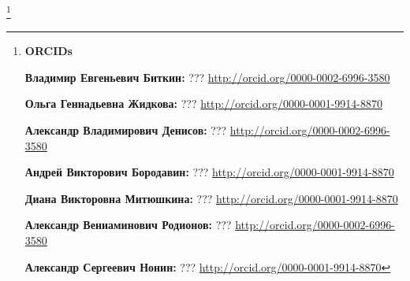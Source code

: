 \thanks{{\bf ORCIDs}



{\bf  Владимир Евгеньевич Биткин:}   ??? \url{http://orcid.org/0000-0002-6996-3580}



{\bf Ольга Геннадьевна Жидкова:}  ???  \url{http://orcid.org/0000-0001-9914-8870}



{\bf  Александр Владимирович Денисов:}   ??? \url{http://orcid.org/0000-0002-6996-3580}



{\bf Андрей Викторович Бородавин:}  ???  \url{http://orcid.org/0000-0001-9914-8870}



{\bf Диана Викторовна Митюшкина:}  ???  \url{http://orcid.org/0000-0001-9914-8870}



{\bf  Александр Вениаминович Родионов:}   ??? \url{http://orcid.org/0000-0002-6996-3580}



{\bf Александр Сергеевич Нонин:}  ???  \url{http://orcid.org/0000-0001-9914-8870}



}



\RusRef

